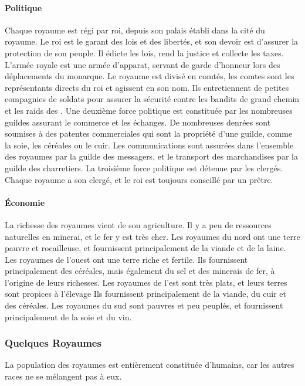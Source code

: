 \documentclass[a4paper,10pt,openany]{book}
\begin{document}
\begin{multicols}{2}
\paragraph{Politique}
Chaque royaume est régi par roi, depuis son palais établi dans la cité du royaume. Le roi est le garant des lois et des libertés, et son devoir est
d’assurer la protection de son peuple. Il édicte les lois, rend la justice et collecte les taxes. L’armée royale est une armée d’apparat, servant
de garde d’honneur lors des déplacements du monarque. Le royaume est divisé en comtés, les comtes sont les représentants directs du roi et
agissent en son nom. Ils entretiennent de petites compagnies de soldats  pour assurer la sécurité contre les bandits de grand chemin et les raids des
\DemiOrcs. Une deuxième force politique est constituée par les nombreuses guildes assurant le commerce et les échanges. De nombreuses denrées
sont soumises à des patentes commerciales qui sont la propriété d’une guilde, comme la soie, les céréales ou le cuir. Les communications sont assurées
dans l’ensemble des royaumes par la guilde des messagers, et le transport des marchandises par la guilde des charretiers. La troisième force
politique est détenue par les clergés. Chaque royaume a son clergé, et le roi est toujours conseillé par un prêtre.
\paragraph{Économie}
La richesse des royaumes vient de son agriculture. Il y a peu de ressources naturelles en minerai, et le fer y est très cher. Les royaumes du nord ont
une terre pauvre et rocailleuse, et fournissent principalement de la viande et de la laine. Les royaumes de l’ouest ont une terre riche et fertile.
Ils fournissent principalement des céréales, mais également du sel et des minerais de fer, à l’origine de leurs richesses. Les royaumes de l’est sont
très plats, et leurs terres sont propices à l’élevage Ils fournissent principalement de la viande, du cuir et des céréales. Les royaumes du sud sont
pauvres et peu peuplés, et fournissent principalement de la soie et du vin. 

\subsubsection{Quelques Royaumes}
La population des royaumes est  entièrement constituée d’humains, car les autres races ne se mélangent pas à eux.

\end{multicols}
\end{document}
